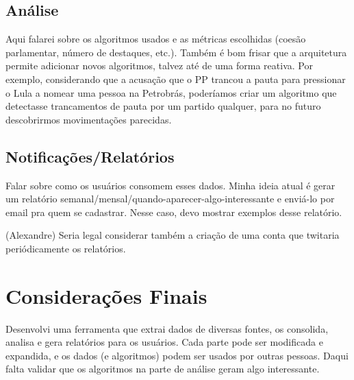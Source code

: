 \documentclass[a4paper,titlepage]{ppgi}\usepackage[]{graphicx}\usepackage[]{color}
\begin{document}

\subsection{Análise}

Aqui falarei sobre os algoritmos usados e as métricas escolhidas (coesão parlamentar, número de destaques, etc.). Também é bom frisar que a arquitetura permite adicionar novos algoritmos, talvez até de uma forma reativa. Por exemplo, considerando que a acusação que o PP trancou a pauta para pressionar o Lula a nomear uma pessoa na Petrobrás, poderíamos criar um algoritmo que detectasse trancamentos de pauta por um partido qualquer, para no futuro descobrirmos movimentações parecidas.

\subsection{Notificações/Relatórios}

Falar sobre como os usuários consomem esses dados. Minha ideia atual é gerar um relatório semanal/mensal/quando-aparecer-algo-interessante e enviá-lo por email pra quem se cadastrar. Nesse caso, devo mostrar exemplos desse relatório.


(Alexandre) Seria legal considerar também a criação de uma conta que twitaria periódicamente os relatórios.


\section{Considerações Finais}

Desenvolvi uma ferramenta que extrai dados de diversas fontes, os consolida, analisa e gera relatórios para os usuários. Cada parte pode ser modificada e expandida, e os dados (e algoritmos) podem ser usados por outras pessoas. Daqui falta validar que os algoritmos na parte de análise geram algo interessante.





\end{document}
